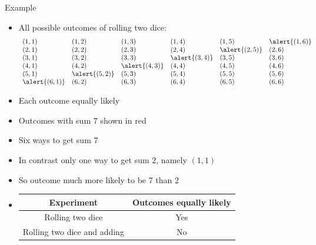 \documentclass[handout]{beamer}
\theoremstyle{definition}
\begin{document}
\begin{frame}{Example}
\begin{itemize}
\item All possible outcomes of rolling two dice:
\[\begin{array}{llllll}
\left(1,1\right)&
\left(1,2\right)&
\left(1,3\right)&
\left(1,4\right)&
\left(1,5\right)&
\alert{\left(1,6\right)}\\
\left(2,1\right)&
\left(2,2\right)&
\left(2,3\right)&
\left(2,4\right)&
\alert{\left(2,5\right)}&
\left(2,6\right)\\
\left(3,1\right)&
\left(3,2\right)&
\left(3,3\right)&
\alert{\left(3,4\right)}&
\left(3,5\right)&
\left(3,6\right)\\
\left(4,1\right)&
\left(4,2\right)&
\alert{\left(4,3\right)}&
\left(4,4\right)&
\left(4,5\right)&
\left(4,6\right)\\
\left(5,1\right)&
\alert{\left(5,2\right)}&
\left(5,3\right)&
\left(5,4\right)&
\left(5,5\right)&
\left(5,6\right)\\
\alert{\left(6,1\right)}&
\left(6,2\right)&
\left(6,3\right)&
\left(6,4\right)&
\left(6,5\right)&
\left(6,6\right)
\end{array}\]
\item Each outcome equally likely
\item Outcomes with sum $7$ shown in \alert{red}
\item Six ways to get sum $7$
\item In contrast only \alert{one} way to get sum $2$, namely $\left(1,1\right)$
\item So outcome much more likely to be $7$ than $2$
\item[]
\begin{tabular}{c|c}
{\bf Experiment}&{\bf Outcomes equally likely}\\\hline
Rolling two dice&Yes\\\hline
Rolling two dice and adding&No
\end{tabular}
\end{itemize}
\end{frame}
\end{document}
